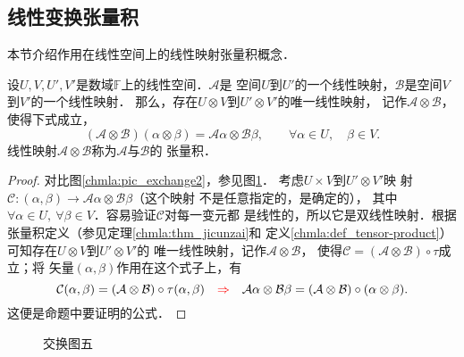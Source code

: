 \subsection{线性变换张量积}
本节介绍作用在线性空间上的线性映射张量积概念．
\begin{proposition}\label{chmla:thm_tp-limap}
    设$U,V,U',V'$是数域$\mathbb{F}$上的线性空间．$\mathcal{A}$是
    空间$U$到$U'$的一个线性映射，$\mathcal{B}$是空间$V$到$V'$的一个线性映射．
    那么，存在$U\otimes V$到$U'\otimes V'$的唯一线性映射，
    记作$\mathcal{A}\otimes \mathcal{B}$，使得下式成立，
    \begin{equation}
        (\mathcal{A}\otimes \mathcal{B}) (\alpha \otimes \beta )
        =\mathcal{A}\alpha \otimes \mathcal{B}\beta ,
        \qquad \forall \alpha \in U, \quad \beta\in V.
    \end{equation}
    线性映射$\mathcal{A}\otimes \mathcal{B}$称为$\mathcal{A}$与$\mathcal{B}$的
    {\heiti 张量积}．
\end{proposition}
\begin{proof}
    对比图\ref{chmla:pic_exchange2}，参见图\ref{chmla:pic_exchange5}．
    考虑$U\times V$到$U'\otimes V'$映
    射$\mathcal{C}:(\alpha,\beta)\to \mathcal{A}\alpha \otimes \mathcal{B}\beta$（这个映射
    不是任意指定的，是确定的），
    其中$\forall \alpha \in U, \ \forall \beta\in V$．容易验证$\mathcal{C}$对每一变元都
    是线性的，所以它是双线性映射．根据张量积定义（参见定理\ref{chmla:thm_jicunzai}和
    定义\ref{chmla:def_tensor-product}）可知存在$U\otimes V$到$U'\otimes V'$的
    唯一线性映射，记作$\mathcal{A}\otimes \mathcal{B}$，
    使得$\mathcal{C}=(\mathcal{A}\otimes \mathcal{B})\circ \tau$成立；将
    矢量$(\alpha,\beta)$作用在这个式子上，有
    \begin{equation*}
        \mathcal{C}(\alpha,\beta)=(\mathcal{A}\otimes \mathcal{B})\circ \tau(\alpha,\beta)
        \quad {\color{red}\Rightarrow} \quad
        \mathcal{A}\alpha \otimes \mathcal{B}\beta
        =(\mathcal{A}\otimes \mathcal{B})\circ (\alpha\otimes\beta) .
    \end{equation*}
    这便是命题中要证明的公式．
\end{proof}

\begin{figure}[htb]
    \centering
    \caption{交换图五}\label{chmla:pic_exchange5}
\end{figure}

